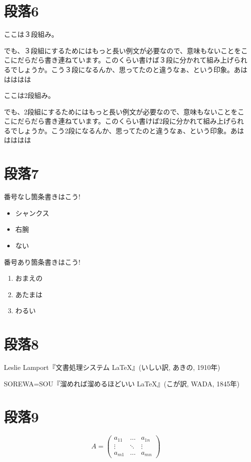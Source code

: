 \documentclass[a4paper,11pt]{jsarticle}
\begin{document}
\section{段落6}
\begin{multicols}{3}
ここは３段組み。
\par
でも、３段組にするためにはもっと長い例文が必要なので、意味もないことをここにだらだら書き連ねています。このくらい書けば３段に分かれて組み上げられるでしょうか。こう３段になるんか、思ってたのと違うなぁ、という印象。あははははは
\end{multicols}
\begin{multicols}{2}
ここは2段組み。
\par
でも、2段組にするためにはもっと長い例文が必要なので、意味もないことをここにだらだら書き連ねています。このくらい書けば2段に分かれて組み上げられるでしょうか。こう2段になるんか、思ってたのと違うなぁ、という印象。あははははは
\end{multicols}
\section{段落7}
番号なし箇条書きはこう!
\begin{itemize}
  \item シャンクス
  \item 右腕
  \item ない
\end{itemize}
番号あり箇条書きはこう!
\begin{enumerate}
  \item おまえの
  \item あたまは
  \item わるい
\end{enumerate}
\section{段落8}
\begin{thebibliography}{99}
  \item Leslie Lamport『文書処理システム \LaTeX』(いしい訳, あきの, 1910年)
  \item SOREWA=SOU『溜めれば溜めるほどいい \LaTeX』(こが訳, WADA, 1845年)
\end{thebibliography}
\section{段落9}
\begin{equation}
  A = \begin{pmatrix}
        a_{11} & \ldots & a_{1n} \\
        \vdots & \ddots & \vdots \\
        a_{m1} & \ldots & a_{mn}
      \end{pmatrix}
\end{equation}
\end{document}
